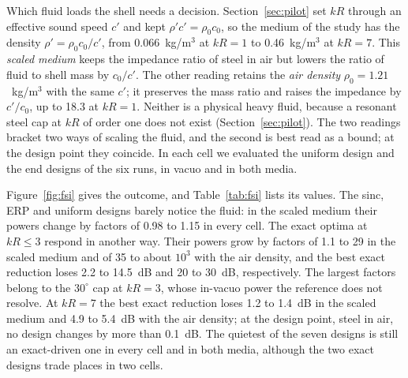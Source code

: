 \documentclass[preprint,12pt]{elsarticle}
\begin{document}
Which fluid loads the shell needs a decision. Section~\ref{sec:pilot} set $kR$ through an effective sound speed $c'$ and kept $\rho'c'=\rho_0c_0$, so the medium of the study has the density $\rho'=\rho_0c_0/c'$, from 0.066~kg/m$^3$ at $kR=1$ to 0.46~kg/m$^3$ at $kR=7$. This \emph{scaled medium} keeps the impedance ratio of steel in air but lowers the ratio of fluid to shell mass by $c_0/c'$. The other reading retains the \emph{air density} $\rho_0=1.21$~kg/m$^3$ with the same $c'$; it preserves the mass ratio and raises the impedance by $c'/c_0$, up to 18.3 at $kR=1$. Neither is a physical heavy fluid, because a resonant steel cap at $kR$ of order one does not exist (Section~\ref{sec:pilot}). The two readings bracket two ways of scaling the fluid, and the second is best read as a bound; at the design point they coincide. In each cell we evaluated the uniform design and the end designs of the six runs, in vacuo and in both media. %

Figure~\ref{fig:fsi} gives the outcome, and Table~\ref{tab:fsi} lists its values. The sinc, ERP and uniform designs barely notice the fluid: in the scaled medium their powers change by factors of 0.98 to 1.15 in every cell. %
The exact optima at $kR\le3$ respond in another way. Their powers grow by factors of 1.1 to 29 in the scaled medium and of 35 to about $10^3$ with the air density, and the best exact reduction loses 2.2 to 14.5~dB and 20 to 30~dB, respectively. %
The largest factors belong to the $30^\circ$ cap at $kR=3$, whose in-vacuo power the reference does not resolve. At $kR=7$ the best exact reduction loses 1.2 to 1.4~dB in the scaled medium and 4.9 to 5.4~dB with the air density; at the design point, steel in air, no design changes by more than 0.1~dB. The quietest of the seven designs is still an exact-driven one in every cell and in both media, although the two exact designs trade places in two cells. %
\end{document}
